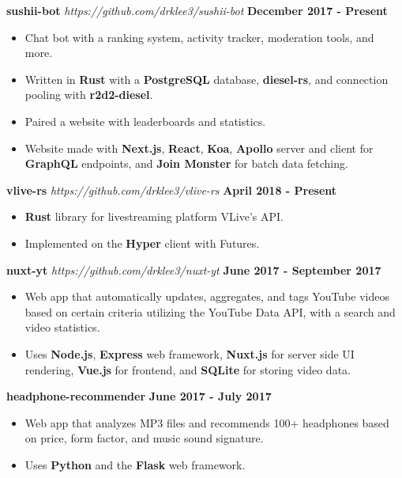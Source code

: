 \documentclass{res}
\begin{document}
\begin{resume}
		{\bf sushii-bot} \emph{https://github.com/drklee3/sushii-bot} \hfill {\bf December 2017 - Present} \\
			\vspace{-3.5mm}
			\begin{itemize} \itemsep -2pt
				\item Chat bot with a ranking system, activity tracker, moderation tools, and more. 
				\item Written in {\bf Rust} with a {\bf PostgreSQL} database, {\bf diesel-rs}, and connection pooling with {\bf r2d2-diesel}.
				\item Paired a website with leaderboards and statistics.
				\item Website made with {\bf Next.js}, {\bf React}, {\bf Koa}, {\bf Apollo} server and client for {\bf GraphQL} endpoints,
					and {\bf Join Monster} for batch data fetching.
			\end{itemize}
		
		{\bf vlive-rs} \emph{https://github.com/drklee3/vlive-rs} \hfill {\bf April 2018 - Present} \\
			\vspace{-3.5mm}
			\begin{itemize} \itemsep -2pt
				\item {\bf Rust} library for livestreaming platform VLive's API.
				\item Implemented on the {\bf Hyper} client with Futures.
			\end{itemize}

		{\bf nuxt-yt} \emph{https://github.com/drklee3/nuxt-yt} \hfill {\bf June 2017 - September 2017} \\
			\vspace{-3.5mm}
			\begin{itemize} \itemsep -2pt
				\item Web app that automatically updates, aggregates, and tags YouTube videos based on certain criteria utilizing the YouTube Data API,
					with a search and video statistics.
				\item Uses {\bf Node.js}, {\bf Express} web framework, {\bf Nuxt.js} for server side 
					UI rendering, {\bf Vue.js} for frontend, and {\bf SQLite} for storing video data.
			\end{itemize}

		{\bf headphone-recommender} \hfill {\bf June 2017 - July 2017} \\
			\vspace{-3.5mm}
			\begin{itemize}	\itemsep -2pt
				\item Web app that analyzes MP3 files and recommends 100+ headphones based on price, form factor, and music sound signature.
				\item Uses {\bf Python} and the {\bf Flask} web framework.
			\end{itemize}
		

\end{resume}
\end{document}
